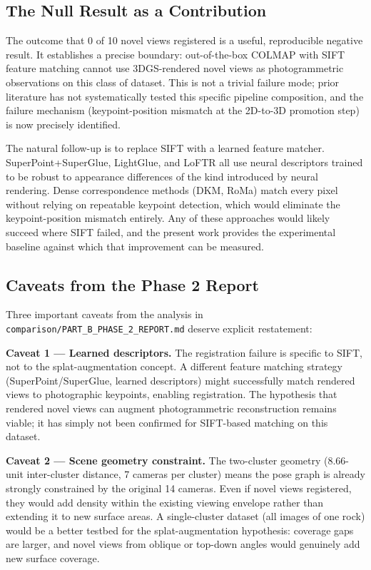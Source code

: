 \documentclass[12pt]{article}
\begin{document}
\subsection{The Null Result as a Contribution}

The outcome that 0 of 10 novel views registered is a useful, reproducible negative result. It establishes a precise boundary: out-of-the-box COLMAP with SIFT feature matching cannot use 3DGS-rendered novel views as photogrammetric observations on this class of dataset. This is not a trivial failure mode; prior literature has not systematically tested this specific pipeline composition, and the failure mechanism (keypoint-position mismatch at the 2D-to-3D promotion step) is now precisely identified.

The natural follow-up is to replace SIFT with a learned feature matcher. SuperPoint+SuperGlue, LightGlue, and LoFTR all use neural descriptors trained to be robust to appearance differences of the kind introduced by neural rendering. Dense correspondence methods (DKM, RoMa) match every pixel without relying on repeatable keypoint detection, which would eliminate the keypoint-position mismatch entirely. Any of these approaches would likely succeed where SIFT failed, and the present work provides the experimental baseline against which that improvement can be measured.

\subsection{Caveats from the Phase 2 Report}

Three important caveats from the analysis in \texttt{comparison/PART\_B\_PHASE\_2\_REPORT.md} deserve explicit restatement:

\textbf{Caveat 1 --- Learned descriptors.} The registration failure is specific to SIFT, not to the splat-augmentation concept. A different feature matching strategy (SuperPoint/SuperGlue, learned descriptors) might successfully match rendered views to photographic keypoints, enabling registration. The hypothesis that rendered novel views can augment photogrammetric reconstruction remains viable; it has simply not been confirmed for SIFT-based matching on this dataset.

\textbf{Caveat 2 --- Scene geometry constraint.} The two-cluster geometry (8.66-unit inter-cluster distance, 7 cameras per cluster) means the pose graph is already strongly constrained by the original 14 cameras. Even if novel views registered, they would add density within the existing viewing envelope rather than extending it to new surface areas. A single-cluster dataset (all images of one rock) would be a better testbed for the splat-augmentation hypothesis: coverage gaps are larger, and novel views from oblique or top-down angles would genuinely add new surface coverage.
\end{document}
